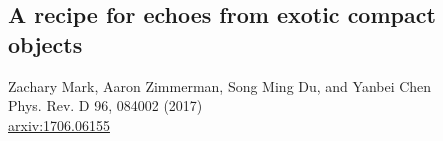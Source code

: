 \begin{refsection}

\newcommand{\ba}{\begin{align}}
\newcommand{\ea}{\end{align}}
\newcommand{\p}{\partial}
\newcommand{\lm}{_{\ell m}}
\newcommand{\bma}{\begin{pmatrix}}
\newcommand{\ema}{\end{pmatrix}}
\newcommand{\R}[1]{\textcolor{red}{#1}}
\newcommand{\aaron}[1]{\textcolor{Orange}{#1}}
\newcommand{\zach}[1]{\textcolor{ForestGreen}{#1}}
\newcommand{\ac}[1]{\textcolor{cyan}{\sout{#1}}}


\newcommand{\Rb}{\tilde{\mathcal R}}
\newcommand{\TBH}{\tilde{\mathcal T}_{\rm BH}}
\newcommand{\RBH}{\tilde{\mathcal R}_{\rm BH}}
\newcommand{\K}{\tilde{\mathcal K}}
\newcommand{\RW}{\tilde{\mathcal R}_{\rm W}}

\newcommand{\psiupA}{\tilde \psi_{\rm up}}%
\newcommand{\psiin}{\tilde \psi_{\rm in}}
\newcommand{\psiref}{\tilde \psi_{\rm ref}}
\newcommand{\psiecho}{\tilde \psi_{\rm echo}}
\newcommand{\gref}{\tilde g_{\rm ref}}
\newcommand{\gBH}{\tilde g_{\rm BH}}
\newcommand{\ZinfBH}{Z^{\infty}_{\rm BH}}
\newcommand{\ZhBH}{Z^{\rm H}_{\rm BH}}
\newcommand{\Zref}{Z^{\infty}_{\rm ref}}
\newcommand{\Zecho}{Z_{\rm echo}}

\chapter{A recipe for echoes from exotic compact objects}
\label{chap:Echo}

\begin{centering}
Zachary Mark, Aaron Zimmerman, Song Ming Du, and Yanbei Chen \\
Phys. Rev. D 96, 084002 (2017) \\
\href{https://https://arxiv.org/abs/1706.06155}{arxiv:1706.06155} \\
\end{centering}


\end{refsection}

